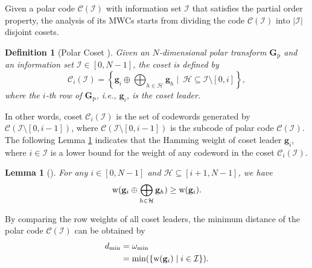 \documentclass[12pt, draftclsnofoot, peerreview, onecolumn]{IEEEtran}
\theoremstyle{noparent}
\newtheorem{lemma}[theorem]{\textbf{Lemma}}
\newtheorem{definition}{\textbf{{Definition}}}
\begin{document}
Given a polar code $\mathcal{C}(\mathcal{I})$ with information set $\mathcal{I}$ that
satisfies the partial order property,
the analysis of its MWCs starts from dividing the code $\mathcal{C}(\mathcal{I})$ into  
$|\mathcal{I}|$ disjoint cosets. 
\begin{definition}[Polar Coset \cite{Rowshan2023FormationMinweight}]
    \label{definition_coset}
    Given an $N$-dimensional polar transform $\mathbf{G}_{\mathrm{p}}$ and
    an information set $\mathcal{I}\in[0,N-1]$, the coset is defined by
    \begin{equation}
        \mathcal{C}_i(\mathcal{I})=\left\{\mathbf{g}_i \oplus \bigoplus_{h\in\mathcal{H}}\mathbf{g}_h \mid \ \mathcal{H}\subseteq \mathcal{I}\setminus[0,i]\right\},
    \label{polar coset}
    \end{equation} 
    where the $i$-th row of $\mathbf{G}_{\mathrm{p}}$, i.e.,
    $\mathbf{g}_i$, is the coset leader.
\end{definition}
In other words, coset $\mathcal{C}_i(\mathcal{I})$ is the set
of codewords generated by $\mathcal{C}(\mathcal{I}\setminus [0,i-1])$,
where $\mathcal{C}(\mathcal{I}\setminus [0,i-1])$ is the subcode of 
polar code $\mathcal{C}(\mathcal{I})$.
The following Lemma \ref{corollary_weight_in_coset} indicates that
the Hamming weight of coset leader $\mathbf{g}_i$, where $i\in \mathcal{I}$ 
is a lower bound for the weight of any codeword in the coset $\mathcal{C}_i(\mathcal{I})$.

\begin{lemma}[\cite{Li2019PretransformedPolar,Rowshan2023FormationMinweight}]
    \label{corollary_weight_in_coset}
    For any $i\in[0,N-1]$ and $\mathcal{H}\subseteq[i+1,N-1]$, we have
    \begin{equation}
        {\rm w}(\mathbf{g}_i \oplus \bigoplus_{h\in\mathcal{H}}\mathbf{g}_h)\geq{\rm w}(\mathbf{g}_i).
        \label{w_coset_biger}
    \end{equation}
\end{lemma}









By comparing the row weights of all coset leaders, 
the minimum distance of the polar code $\mathcal{C}(\mathcal{I})$ can be obtained by 
\begin{equation}
    \label{minimum_weight}
    \begin{aligned}    
    d_{\min}&=\omega_{\min}\\&=\min(\{{{\rm w}(\mathbf{g}_i}) \mid i\in \mathcal{I}\}).
\end{aligned}
\end{equation}
\end{document}

